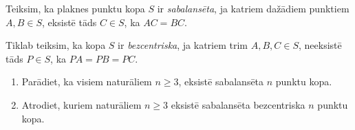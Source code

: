 \begin{problem}
Teiksim, ka plaknes punktu kopa $S$ ir \emph{sabalansēta}, ja katriem dažādiem punktiem $A,B \in S $, eksistē tāds $C \in S$, ka $AC=BC$.

Tiklab teiksim, ka kopa $S$ ir \emph{bezcentriska}, ja katriem trim $A,B,C \in S$, neeksistē tāds $P \in S$, ka $PA=PB=PC$.
\begin{enumerate}
\item Parādiet, ka visiem naturāliem $n\geq 3$, eksistē sabalansēta $n$ punktu kopa.
\item Atrodiet, kuriem naturāliem $n\geq 3$ eksistē sabalansēta bezcentriska $n$ punktu kopa.
\end{enumerate}

\end{problem}

%

